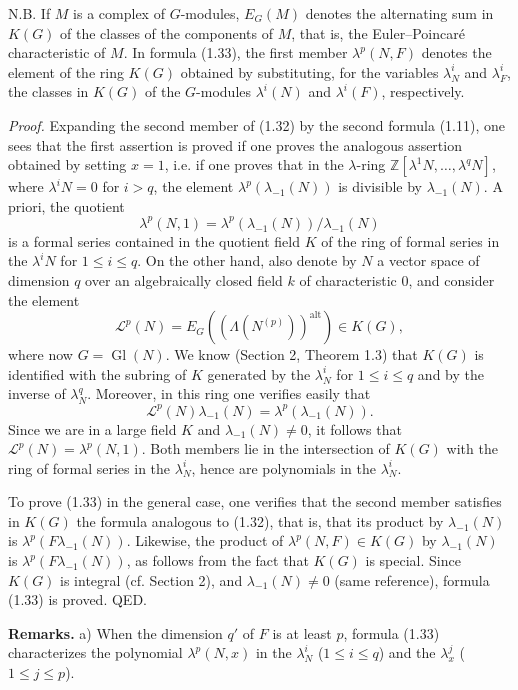 \documentclass[11pt]{article}
\providecommand{\Z}{\mathbb Z}
\providecommand{\Gl}{\operatorname{Gl}}
\begin{document}
N.B. If $M$ is a complex of $G$-modules, $E_G(M)$ denotes the alternating sum in $K(G)$ of the classes of the components of $M$, that is, the Euler--Poincaré characteristic of $M$. In formula (1.33), the first member $\lambda^p(N,F)$ denotes the element of the ring $K(G)$ obtained by substituting, for the variables $\lambda^i_N$ and $\lambda^i_F$, the classes in $K(G)$ of the $G$-modules $\lambda^i(N)$ and $\lambda^i(F)$, respectively.

\emph{Proof.} Expanding the second member of (1.32) by the second formula (1.11), one sees that the first assertion is proved if one proves the analogous assertion obtained by setting $x=1$, i.e. if one proves that in the $\lambda$-ring $\Z[\lambda^1N,\ldots,\lambda^qN]$, where $\lambda^iN=0$ for $i>q$, the element $\lambda^p(\lambda_{-1}(N))$ is divisible by $\lambda_{-1}(N)$. A priori, the quotient
\[
\lambda^p(N,1)=\lambda^p(\lambda_{-1}(N))/\lambda_{-1}(N)
\]
is a formal series contained in the quotient field $K$ of the ring of formal series in the $\lambda^iN$ for $1\leq i\leq q$. On the other hand, also denote by $N$ a vector space of dimension $q$ over an algebraically closed field $k$ of characteristic $0$, and consider the element
\[
\mathscr L^p(N)=E_G((\Lambda(N^{(p)}))^{\mathrm{alt}})\in K(G),
\]
where now $G=\Gl(N)$. We know (Section 2, Theorem 1.3) that $K(G)$ is identified with the subring of $K$ generated by the $\lambda^i_N$ for $1\leq i\leq q$ and by the inverse of $\lambda_N^q$. Moreover, in this ring one verifies easily that
\[
\mathscr L^p(N)\lambda_{-1}(N)=\lambda^p(\lambda_{-1}(N)).
\]
Since we are in a large field $K$ and $\lambda_{-1}(N)\neq 0$, it follows that $\mathscr L^p(N)=\lambda^p(N,1)$. Both members lie in the intersection of $K(G)$ with the ring of formal series in the $\lambda_N^i$, hence are polynomials in the $\lambda_N^i$.

To prove (1.33) in the general case, one verifies that the second member satisfies in $K(G)$ the formula analogous to (1.32), that is, that its product by $\lambda_{-1}(N)$ is $\lambda^p(F\lambda_{-1}(N))$. Likewise, the product of $\lambda^p(N,F)\in K(G)$ by $\lambda_{-1}(N)$ is $\lambda^p(F\lambda_{-1}(N))$, as follows from the fact that $K(G)$ is special. Since $K(G)$ is integral (cf. Section 2), and $\lambda_{-1}(N)\neq 0$ (same reference), formula (1.33) is proved. QED.

\textbf{Remarks.} a) When the dimension $q'$ of $F$ is at least $p$, formula (1.33) characterizes the polynomial $\lambda^p(N,x)$ in the $\lambda_N^i$ ($1\leq i\leq q$) and the $\lambda_x^j$ ($1\leq j\leq p$).
\end{document}
